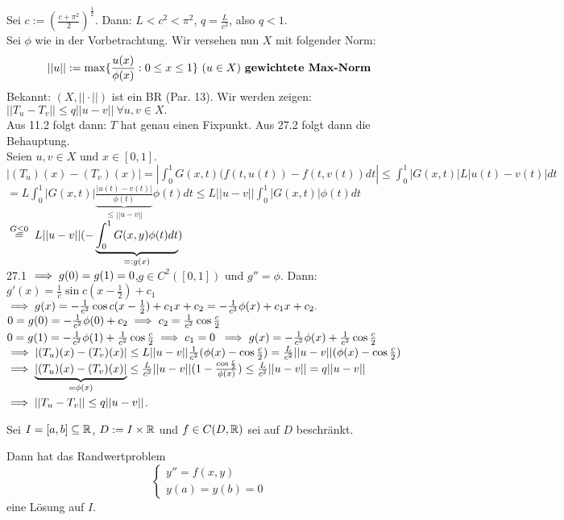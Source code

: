 \documentclass{article}
\begin{document}
\begin{beweis}
Sei $c:=(\frac{c+\pi^2}{2})^{\frac{1}{2}}$. Dann: $L<c^2<\pi^2$, $q=\frac{L}{c^2}$, also $q<1$.\\
Sei $\phi$ wie in der Vorbetrachtung. Wir versehen nun $X$ mit folgender Norm:
$$ ||u|| := \max\{\frac{u(x)}{\phi(x)}:0\le x\le 1\}\ (u \in X) \text{ \begriff{gewichtete Max-Norm}}$$
Bekannt: $(X,||\cdot||)$ ist ein BR (Par. 13). Wir werden zeigen: \\
$||T_u-T_v||\le q||u-v||\ \forall u,v \in X.$\\
Aus 11.2 folgt dann: $T$ hat genau einen Fixpunkt. Aus 27.2 folgt dann die Behauptung.\\
Seien $u,v \in X$ und $x\in[0,1]$.
$|(T_u)(x)-(T_v)(x)|=|\int_0^1G(x,t)(f(t,u(t))-f(t,v(t))dt|\le\int_0^1|G(x,t)|L|u(t)-v(t)|dt$\\
$=L\int_0^1|G(x,t)|\underbrace{\frac{|u(t)-v(t)|}{\phi(t)}}_{ \le||u-v||}\phi(t)dt \le L||u-v||\int_0^1|G(x,t)|\phi(t)dt$\\
$\gleichwegen{G\le0} L||u-v||(-\underbrace{\int_0^1G(x,y)\phi(t)dt}_{=:g(x)})$\\
27.1 $\implies g(0)=g(1)=0$,$g\in C^2([0,1])$ und $g''=\phi$. Dann: $g'(x)=\frac{1}{c}\sin{c(x-\frac{1}{2})}+c_1$\\
$\implies g(x) = -\frac{1}{c^2}\cos{c(x-\frac{1}{2})}+c_1x+c_2=-\frac{1}{c^2}\phi(x)+c_1x+c_2.$\\
$0=g(0)=-\frac{1}{c^2}\phi(0)+c_2 \implies c_2 = \frac{1}{c^2}\cos{\frac{c}{2}}$
$0=g(1)=-\frac{1}{c^2}\phi(1)+\frac{1}{c^2}\cos{\frac{c}{2}} \implies c_1 = 0$
$\implies g(x)=-\frac{1}{c^2}\phi(x)+\frac{1}{c^2}\cos{\frac{c}{2}}$\\
$\implies |(T_u)(x)-(T_v)(x)|\le L||u-v|| \frac{1}{c^2}(\phi(x)-\cos{\frac{c}{2}}) = \frac{L}{c^2}||u-v||(\phi(x)-\cos{\frac{c}{2}})$
$\implies \underbrace{|(T_u)(x)-(T_v)(x)|}_{=\phi(x)}\le \frac{L}{c^2}||u-v||(1-\frac{\cos{\frac{c}{2}}}{\phi(x)})\le\frac{L}{c^2}||u-v||=q||u-v||$\\
$\implies ||T_u-T_v||\le q||u-v||$.
\end{beweis}

\begin{satz}
Sei $I=[a,b]\subseteq \mathbb{R}$, $D:= I\times \mathbb{R}$ und $f\in C(D,\mathbb{R})$ sei auf $D$ beschränkt.

Dann hat das Randwertproblem
\[ \begin{cases} y'' = f(x,y) \\ y(a) = y(b) = 0 \end{cases} \]
eine Lösung auf $I$.
\end{satz}
\end{document}
